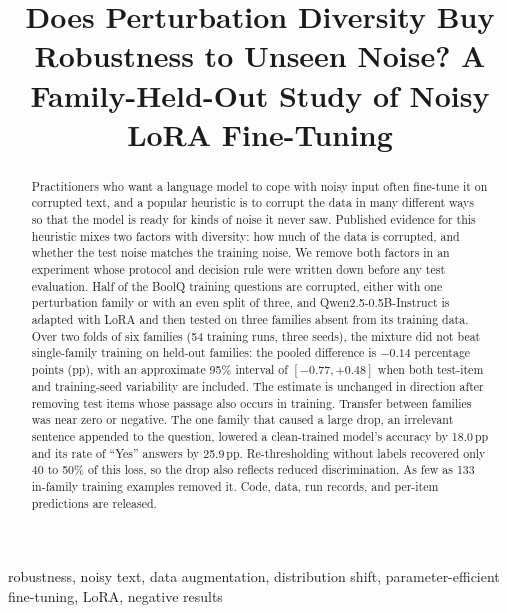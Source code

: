 \documentclass[conference]{IEEEtran}
\newcommand{\ppts}{\,pp}
\begin{document}
\title{Does Perturbation Diversity Buy Robustness to Unseen Noise? A Family-Held-Out Study of Noisy LoRA Fine-Tuning}

\author{
}

\maketitle

\begin{abstract}
Practitioners who want a language model to cope with noisy input often fine-tune it on corrupted text, and a popular heuristic is to corrupt the data in many different ways so that the model is ready for kinds of noise it never saw. Published evidence for this heuristic mixes two factors with diversity: how much of the data is corrupted, and whether the test noise matches the training noise. We remove both factors in an experiment whose protocol and decision rule were written down before any test evaluation. Half of the BoolQ training questions are corrupted, either with one perturbation family or with an even split of three, and Qwen2.5-0.5B-Instruct is adapted with LoRA and then tested on three families absent from its training data. Over two folds of six families (54 training runs, three seeds), the mixture did not beat single-family training on held-out families: the pooled difference is $-0.14$ percentage points (pp), with an approximate 95\% interval of $[-0.77, +0.48]$ when both test-item and training-seed variability are included. The estimate is unchanged in direction after removing test items whose passage also occurs in training. Transfer between families was near zero or negative. The one family that caused a large drop, an irrelevant sentence appended to the question, lowered a clean-trained model's accuracy by 18.0\ppts{} and its rate of ``Yes'' answers by 25.9\ppts{}. Re-thresholding without labels recovered only 40 to 50\% of this loss, so the drop also reflects reduced discrimination. As few as 133 in-family training examples removed it. Code, data, run records, and per-item predictions are released.
\end{abstract}

\begin{IEEEkeywords}
robustness, noisy text, data augmentation, distribution shift, parameter-efficient fine-tuning, LoRA, negative results
\end{IEEEkeywords}
\end{document}

